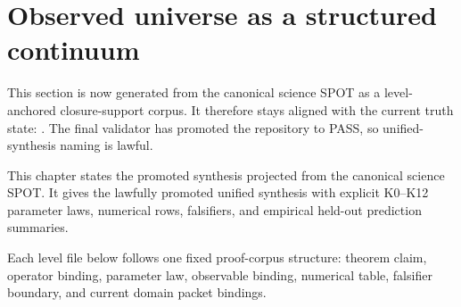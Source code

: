 \section{Observed universe as a structured continuum}
\label{sec:observed-universe-continuum}

This section is now generated from the canonical science SPOT as a level-anchored closure-support corpus.
It therefore stays aligned with the current truth state: . The final validator has promoted the repository to PASS, so unified-synthesis naming is lawful.

This chapter states the promoted synthesis projected from the canonical science SPOT. It gives the lawfully promoted unified synthesis with explicit K0--K12 parameter laws, numerical rows, falsifiers, and empirical held-out prediction summaries.

Each level file below follows one fixed proof-corpus structure: theorem claim, operator binding, parameter law, observable binding, numerical table, falsifier boundary, and current domain packet bindings.














